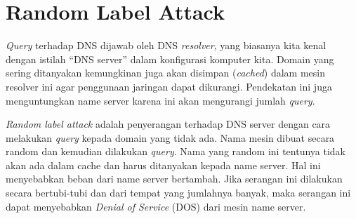 \section{Random Label Attack}
{\em Query} terhadap DNS dijawab oleh DNS {\em resolver}, yang biasanya kita
kenal dengan istilah ``DNS server'' dalam konfigurasi komputer kita. Domain
yang sering ditanyakan kemungkinan juga akan disimpan ({\em cached}) dalam
mesin resolver ini agar penggunaan jaringan dapat dikurangi. Pendekatan ini
juga menguntungkan name server karena ini akan mengurangi jumlah {\em query}.

{\em Random label attack} adalah penyerangan terhadap DNS server dengan cara
melakukan {\em query} kepada domain yang tidak ada. Nama mesin dibuat secara
random dan kemudian dilakukan {\em query}. Nama yang random ini tentunya tidak
akan ada dalam cache dan harus ditanyakan kepada name server. Hal ini
menyebabkan beban dari name server bertambah. Jika serangan ini dilakukan
secara bertubi-tubi dan dari tempat yang jumlahnya banyak, maka serangan ini
dapat menyebabkan {\em Denial of Service} (DOS) dari mesin name server.
